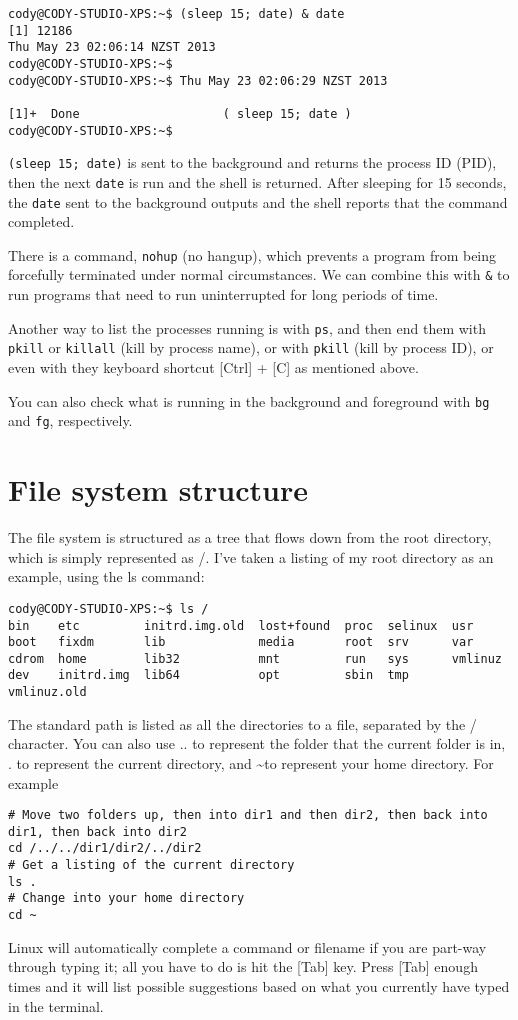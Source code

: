 \documentclass{article}
\begin{document}
\begin{verbatim}
cody@CODY-STUDIO-XPS:~$ (sleep 15; date) & date 
[1] 12186
Thu May 23 02:06:14 NZST 2013
cody@CODY-STUDIO-XPS:~$ 
cody@CODY-STUDIO-XPS:~$ Thu May 23 02:06:29 NZST 2013

[1]+  Done                    ( sleep 15; date )
cody@CODY-STUDIO-XPS:~$ 
\end{verbatim}
\texttt{(sleep 15; date)} is sent to the background and returns the process ID (PID), then the next \texttt{date} is run and the shell is returned. After sleeping for 15 seconds, the \texttt{date} sent to the background outputs and  the shell reports that the command completed. 

There is a command, \texttt{nohup} (no hangup), which prevents a program from being forcefully terminated under normal circumstances. We can combine this with \texttt{\&} to run programs that need to run uninterrupted for long periods of time. 

Another way to list the processes running is with \texttt{ps}, and then end them with \texttt{pkill} or \texttt{killall} (kill by process name), or with \texttt{pkill} (kill by process ID), or even with they keyboard shortcut [Ctrl] + [C] as mentioned above.

You can also check what is running in the background and foreground with \texttt{bg} and \texttt{fg}, respectively.
 
\section{File system structure}
The file system is structured as a tree that flows down from the root directory, which is simply represented as /. I've taken a listing of my root directory as an example, using the ls command:
\begin{verbatim}
cody@CODY-STUDIO-XPS:~$ ls /
bin    etc         initrd.img.old  lost+found  proc  selinux  usr
boot   fixdm       lib             media       root  srv      var
cdrom  home        lib32           mnt         run   sys      vmlinuz
dev    initrd.img  lib64           opt         sbin  tmp      vmlinuz.old
\end{verbatim}
The standard path is listed as all the directories to a file, separated by the / character.
You can also use .. to represent the folder that the current folder is in, . to represent the current directory, and \textasciitilde to represent your home directory. For example
\begin{verbatim}
# Move two folders up, then into dir1 and then dir2, then back into dir1, then back into dir2
cd /../../dir1/dir2/../dir2
# Get a listing of the current directory
ls .
# Change into your home directory
cd ~
\end{verbatim}
Linux will automatically complete a command or filename if you are part-way through typing it; all you have to do is hit the [Tab] key. Press [Tab] enough times and it will list possible suggestions based on what you currently have typed in the terminal.
\end{document}
